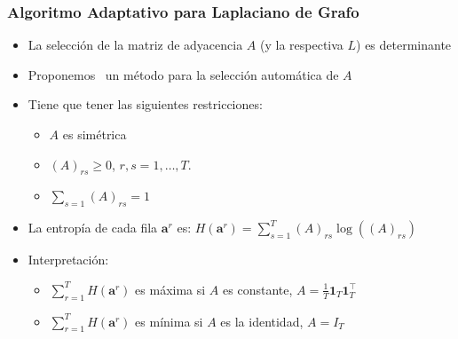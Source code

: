 \documentclass[aspectratio=43,spanish]{beamer}
\newcommand{\norm}[1]{\left\lVert#1\right\rVert}
\newcommand{\opt}[1]{{#1}^*}
\newcommand{\myvec}[1]{\bm{#1}}
\newcommand{\fv}[1]{\myvec{#1}}
\newcommand{\ntasks}{T}
\begin{document}
\begin{frame}
      \frametitle{Algoritmo Adaptativo para Laplaciano de Grafo}

      \begin{itemize}
            \item La selección de la matriz de adyacencia $A$ (y la respectiva $L$) es determinante
            \item Proponemos~ un método para la selección automática de $A$
            \item Tiene que tener las siguientes restricciones:
            \begin{itemize}
                  \item $A$ es simétrica
                  \item $(A)_{rs} \geq 0$, $r, s=1, \ldots, \ntasks$.
                  \item $\sum_{s=1} (A)_{rs} = 1$
              \end{itemize}
            \item La entropía de cada fila $\fv{a}^r$ es: $H(\fv{a}^r) = \sum_{s=1}^\ntasks (A)_{rs} \log((A)_{rs})$
            \item Interpretación:
            \begin{itemize}
                  \item $\sum_{r=1}^\ntasks H(\fv{a}^r) $ es máxima si $A$ es constante, $A = \frac{1}{\ntasks} \fv{1}_\ntasks \fv{1}_\ntasks^\intercal$
                  \item $\sum_{r=1}^\ntasks H(\fv{a}^r) $ es mínima si $A$ es la identidad, $A = I_\ntasks$ 
            \end{itemize}
            
      \end{itemize}

\end{frame}
\end{document}
